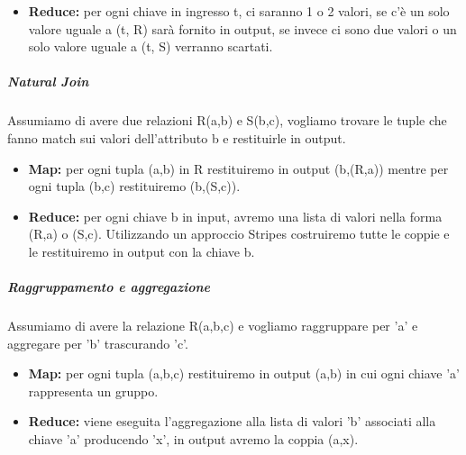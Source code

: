 \documentclass{article}
\begin{document}
\begin{appendices}
\begin{itemize}
    \item \textbf{Reduce:} per ogni chiave in ingresso t, ci saranno 1 o 2 valori, se c'è un solo valore uguale a (t, R) sarà fornito in output, se invece ci sono due valori o un solo valore uguale a (t, S) verranno scartati.  
\end{itemize}
\subparagraph{Natural Join}
Assumiamo di avere due relazioni R(a,b) e S(b,c), vogliamo trovare le tuple che fanno match sui valori dell'attributo b e restituirle in output.
\begin{itemize}
    \item \textbf{Map:} per ogni tupla (a,b) in R restituiremo in output (b,(R,a)) mentre per ogni tupla (b,c) restituiremo (b,(S,c)).
    \item \textbf{Reduce:} per ogni chiave b in input, avremo una lista di valori nella forma (R,a) o (S,c). Utilizzando un approccio Stripes costruiremo tutte le coppie e le restituiremo in output con la chiave b.  
\end{itemize}
\subparagraph{Raggruppamento e aggregazione}
Assumiamo di avere la relazione R(a,b,c) e vogliamo raggruppare per 'a' e aggregare per 'b' trascurando 'c'.
\begin{itemize}
    \item \textbf{Map:} per ogni tupla (a,b,c) restituiremo in output (a,b) in cui ogni chiave 'a' rappresenta un gruppo.
    \item \textbf{Reduce:} viene eseguita l'aggregazione alla lista di valori 'b' associati alla chiave 'a' producendo 'x', in output avremo la coppia (a,x).  
\end{itemize}


\end{appendices}
\end{document}
